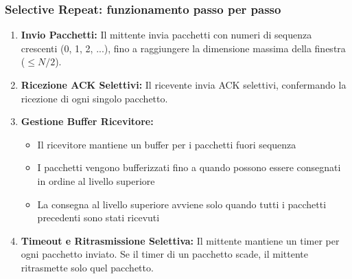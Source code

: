 \subsubsection*{Selective Repeat: funzionamento passo per passo}
\begin{enumerate}
  \item \textbf{Invio Pacchetti:} Il mittente invia pacchetti con numeri di sequenza crescenti (0, 1, 2, ...), fino a raggiungere la dimensione massima della finestra ($\le N/2$).
  \item \textbf{Ricezione ACK Selettivi:} Il ricevente invia ACK selettivi, confermando la ricezione di ogni singolo pacchetto.
  \item \textbf{Gestione Buffer Ricevitore:}
  \begin{itemize}
    \item Il ricevitore mantiene un buffer per i pacchetti fuori sequenza
    \item I pacchetti vengono bufferizzati fino a quando possono essere consegnati in ordine al livello superiore
    \item La consegna al livello superiore avviene solo quando tutti i pacchetti precedenti sono stati ricevuti
  \end{itemize}
  \item \textbf{Timeout e Ritrasmissione Selettiva:} Il mittente mantiene un timer per ogni pacchetto inviato. Se il timer di un pacchetto scade, il mittente ritrasmette solo quel pacchetto.
  

\end{enumerate}
